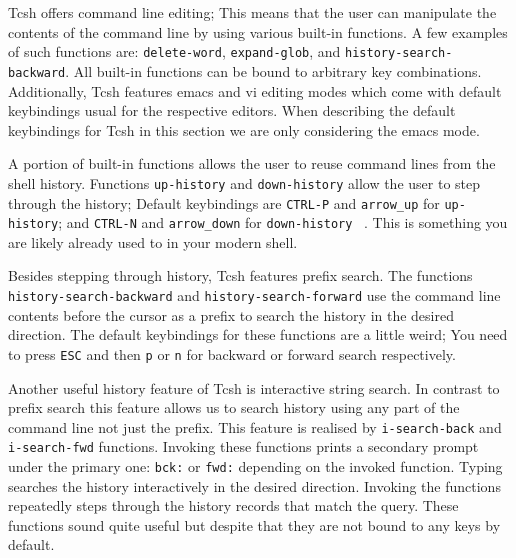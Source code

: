 \documentclass[thesis=M,english]{FITthesis}[2012/10/20]
\newcommand{\redtext}[1]{\textcolor{red}{[[#1]]}}
\let\myCite\cite
\renewcommand\cite{\unskip~\myCite}
\begin{document}
Tcsh offers command line editing; This means that the user can manipulate the contents of the command line by using various built-in functions. A few examples of such functions are: \verb|delete-word|, \verb|expand-glob|, and \verb|history-search-backward|. All built-in functions can be bound to arbitrary key combinations. Additionally, Tcsh features emacs and vi editing modes which come with default keybindings usual for the respective editors. When describing the default keybindings for Tcsh in this section we are only considering the emacs mode.

A portion of built-in functions allows the user to reuse command lines from the shell history. Functions \verb|up-history| and \verb|down-history| allow the user to step through the history; Default keybindings are \verb|CTRL-P| and \verb|arrow_up| for \verb|up-history|; and \verb|CTRL-N| and \verb|arrow_down| for  \verb|down-history| \cite{tcshman}. This is something you are likely already used to in your modern shell.

  

Besides stepping through history, Tcsh features prefix search. The functions \verb|history-search-backward|  and \verb|history-search-forward| use the command line contents before the cursor as a prefix to search the history in the desired direction. The default keybindings for these functions are a little weird; 
You need to press \verb|ESC| and then \verb|p| or \verb|n| for backward or forward search respectively. 

Another useful history feature of Tcsh is interactive string search. In contrast to prefix search this feature allows us to search history using any part of the command line not just the prefix. This feature is realised by \verb|i-search-back| and \verb|i-search-fwd| functions. Invoking these functions prints a secondary prompt under the primary one: \verb|bck:| or \verb|fwd:| depending on the invoked function. Typing searches the history interactively in the desired direction. Invoking the functions repeatedly steps through the history records that match the query.
These functions sound quite useful but despite that they are not bound to any keys by default.
\end{document}
